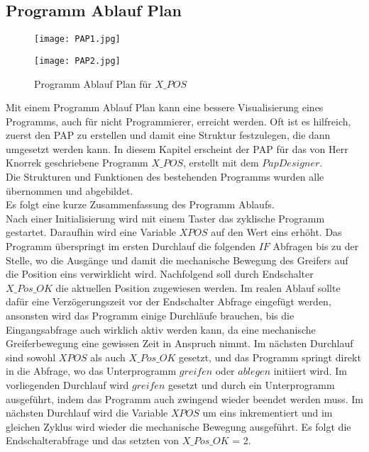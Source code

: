 \documentclass[12pt,a4paper]{scrartcl}	%
\begin{document}
\subsection{Programm Ablauf Plan}
\begin{figure}[!h]
	\centering
	\texttt{[image: PAP1.jpg]}
\end{figure}
\begin{figure}[!h]
	\centering
	\texttt{[image: PAP2.jpg]}
	\caption[Programm Ablauf Plan für $X\_POS$]{Programm Ablauf Plan für $X\_POS$}
	\label{pap}
\end{figure}
Mit einem Programm Ablauf Plan kann eine bessere Visualisierung eines Programms, auch für nicht Programmierer, erreicht werden. Oft ist es hilfreich, zuerst den PAP zu erstellen und damit eine Struktur festzulegen, die dann umgesetzt werden kann.
In diesem Kapitel erscheint der PAP für das von Herr Knorrek geschriebene Programm $X\_POS$, erstellt mit dem $PapDesigner$.\\
Die Strukturen und Funktionen des bestehenden Programms wurden alle übernommen und abgebildet.\\
Es folgt eine kurze Zusammenfassung des Programm Ablaufs.\\
Nach einer Initialisierung wird mit einem Taster das zyklische Programm gestartet. Daraufhin wird eine Variable $XPOS$ auf den Wert eins erhöht. Das Programm überspringt im ersten Durchlauf die folgenden $IF$ Abfragen bis zu der Stelle, wo die Ausgänge und damit die mechanische Bewegung des Greifers auf die Position eins verwirklicht wird. Nachfolgend soll durch Endschalter $X\_Pos\_OK$ die aktuellen Position zugewiesen werden. Im realen Ablauf sollte dafür eine Verzögerungszeit vor der Endschalter Abfrage eingefügt werden, ansonsten wird das Programm einige Durchläufe brauchen, bis die Eingangsabfrage auch wirklich aktiv werden kann, da eine mechanische Greiferbewegung eine gewissen Zeit in Anspruch nimmt. Im nächsten Durchlauf sind sowohl $XPOS$ als auch $X\_Pos\_OK$ gesetzt, und das Programm springt direkt in die Abfrage, wo das Unterprogramm $greifen$ oder $ablegen$ initiiert wird. Im vorliegenden Durchlauf wird $greifen$ gesetzt und durch ein Unterprogramm ausgeführt, indem das Programm auch zwingend wieder beendet werden muss. Im nächsten Durchlauf wird die Variable $XPOS$ um eins inkrementiert und im gleichen Zyklus wird wieder die mechanische Bewegung ausgeführt. Es folgt die Endschalterabfrage und das setzten von $X\_Pos\_OK$ = 2.
\end{document}
